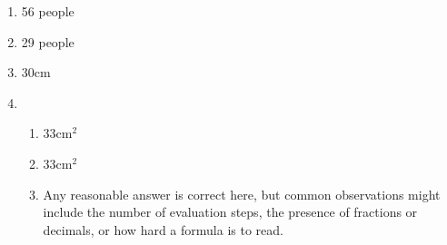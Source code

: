 \documentclass[a4paper,12pt]{article}
\begin{document}
\begin{enumerate}
\item 56 people %

\item 29 people %

\item 30cm %

\item %
    \begin{enumerate}
    \item 33cm$^2$
    \item 33cm$^2$
    \item Any reasonable answer is correct here, but common 
        observations might include the number of evaluation steps, 
        the presence of fractions or decimals, or how hard a 
        formula is to read.
    \end{enumerate}
\end{enumerate}
\end{document}
